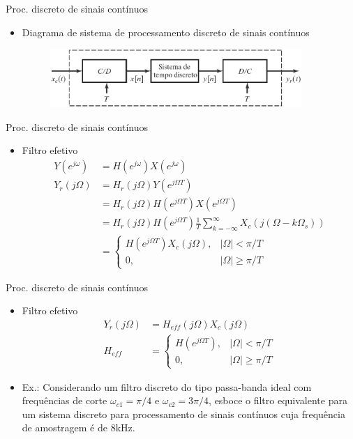 \begin{slide}{Proc. discreto de sinais cont\'inuos}
\begin{itemize}
   \item Diagrama de sistema de processamento discreto de sinais cont\'inuos
   \begin{figure}
      \centering
      \includegraphics[width=0.9\textwidth]{figs/procdiscreto.eps}
   \end{figure}
\end{itemize}
\end{slide}

\begin{slide}{Proc. discreto de sinais cont\'inuos}
\begin{itemize}
   \item Filtro efetivo
   \begin{align}
      Y(e^{j\omega}) &= H(e^{j\omega}) X(e^{j\omega})\\
      Y_r(j\Omega)   &= H_r(j\Omega)Y(e^{j\Omega T})\\
                     &= H_r(j\Omega)H(e^{j\Omega T}) X(e^{j\Omega T})\\
                     &= H_r(j\Omega)H(e^{j\Omega T})\frac{1}{T}\sum_{k=-\infty}^{\infty}X_c(j(\Omega-k\Omega_s))\\
                     &= \begin{cases} H(e^{j\Omega T}) X_c(j\Omega), & |\Omega|<\pi /T \\
                                      0,                             & |\Omega|\geq\pi /T
                        \end{cases}
   \end{align}
\end{itemize}
\end{slide}

\begin{slide}{Proc. discreto de sinais cont\'inuos}
\begin{itemize}
   \item Filtro efetivo
   \begin{align}
      Y_r(j\Omega)   &= H_{eff}(j\Omega)X_c(j\Omega)\\
      H_{eff}        &= \begin{cases} H(e^{j\Omega T}), & |\Omega|<\pi /T \\
                                      0,                & |\Omega|\geq\pi /T
                        \end{cases}
   \end{align}
   \item Ex.: Considerando um filtro discreto do tipo passa-banda ideal com frequ\^encias de corte $\omega_{c1}=\pi/4$ e $\omega_{c2}=3\pi/4$, esboce o filtro equivalente para um sistema discreto para processamento de sinais cont\'inuos cuja frequ\^encia de amostragem \'e de $8$kHz. 
\end{itemize}
\end{slide}


